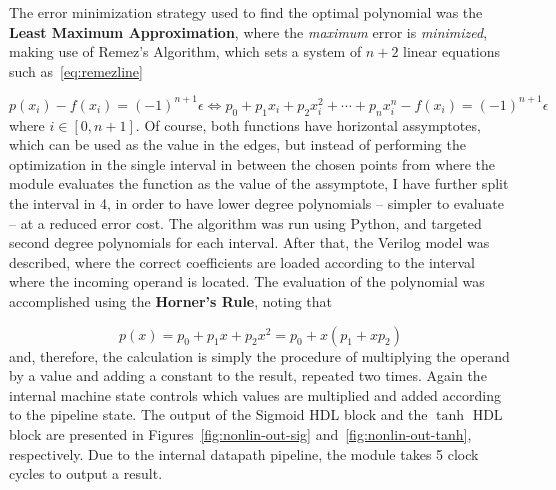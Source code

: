 \documentclass{IEEEtran}
\begin{document}
The error minimization strategy used to find the optimal polynomial was the \textbf{Least Maximum Approximation}, where the \emph{maximum} error is \emph{minimized}, making use of Remez's Algorithm, which sets a system of $n+2$ linear equations such as~\ref{eq:remezline}

\begin{equation}\label{eq:remezline}
    p(x_i) - f(x_i) = (-1)^{n+1} \epsilon \Leftrightarrow p_0 + p_1 x_i + p_2 x_i^2 + \cdots + p_n x_i^n - f(x_i) = (-1)^{n+1} \epsilon
\end{equation}
where $i \in \left[0, n+1\right]$. Of course, both functions have horizontal assymptotes, which can be used as the value in the edges, but instead of performing the optimization in the single interval in between the chosen points from where the module evaluates the function as the value of the assymptote, I have further split the interval in 4, in order to have lower degree polynomials -- simpler to evaluate -- at a reduced error cost. The algorithm was run using Python, and targeted second degree polynomials for each interval. After that, the Verilog model was described, where the correct coefficients are loaded according to the interval where the incoming operand is located. The evaluation of the polynomial was accomplished using the \textbf{Horner's Rule}, noting that

\begin{equation}\label{eq:factorPol}
p(x) = p_0 + p_1x + p_2x^2 = p_0 + x(p_1 + xp_2)
\end{equation}
and, therefore, the calculation is simply the procedure of multiplying the operand by a value and adding a constant to the result,
repeated two times. Again the internal machine state controls which values are multiplied and added according to the pipeline state.
The output of the Sigmoid HDL block  and the $\tanh$ HDL block are presented in Figures~\ref{fig:nonlin-out-sig} 
and~\ref{fig:nonlin-out-tanh}, respectively. Due to the internal datapath pipeline, the module takes 5 clock cycles to output a result.
\end{document}
